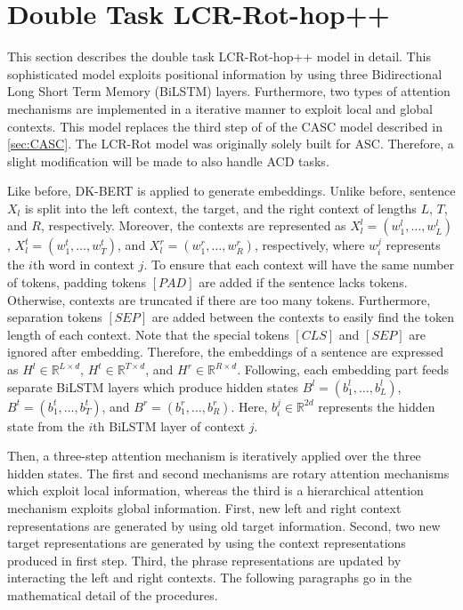 \documentclass[american, oneside]{ecsgdp}
\begin{document}
\section{Double Task LCR-Rot-hop++} \label{sec:LCR-Rot}
This section describes the double task LCR-Rot-hop++ model \parencite{Trusca2020HAABSA++} in detail. This sophisticated model exploits positional information by using three Bidirectional Long Short Term Memory (BiLSTM) layers. Furthermore, two types of attention mechanisms are implemented in a iterative manner to exploit local and global contexts. This model replaces the third step of of the CASC model described in \cref{sec:CASC}. The LCR-Rot model was originally solely built for ASC. Therefore, a slight modification will be made to also handle ACD tasks.

Like before, DK-BERT is applied to generate embeddings. Unlike before, sentence $X_l$ is split into the left context, the target, and the right context of lengths $L$, $T$, and $R$, respectively. Moreover, the contexts are represented as $X_l^l = \left ( w_1^l, \ldots, w_L^l \right )$, $X_l^t = \left ( w_1^t, \ldots, w_T^t \right )$, and $X_l^r = \left ( w_1^r, \ldots, w_R^r \right )$, respectively, where $w_i^j$ represents the $i$th word in context $j$. To ensure that each context will have the same number of tokens, padding tokens $[PAD]$ are added if the sentence lacks tokens. Otherwise, contexts are truncated if there are too many tokens. Furthermore, separation tokens $[SEP]$ are added between the contexts to easily find the token length of each context. Note that the special tokens $[CLS]$ and $[SEP]$ are ignored after embedding. Therefore, the embeddings of a sentence are expressed as $H^l \in \mathbb{R}^{L \times d}$, $H^t \in \mathbb{R}^{T \times d}$, and $H^r \in \mathbb{R}^{R \times d}$. Following, each embedding part feeds separate BiLSTM layers which produce hidden states $B^l = \left( b_1^l, \dots, b_L^l \right)$, $B^t = \left( b_1^t, \dots, b_T^t \right)$, and $B^r = \left( b_1^r, \dots, b_R^r \right)$. Here, $b_i^j \in \mathbb{R}^{2d}$ represents the hidden state from the $i$th BiLSTM layer of context $j$.

Then, a three-step attention mechanism is iteratively applied over the three hidden states. The first and second mechanisms are rotary attention mechanisms which exploit local information, whereas the third is a hierarchical attention mechanism exploits global information. First, new left and right context representations are generated by using old target information. Second, two new target representations are generated by using the context representations produced in first step. Third, the phrase representations are updated by interacting the left and right contexts. The following paragraphs go in the mathematical detail of the procedures.
\end{document}
